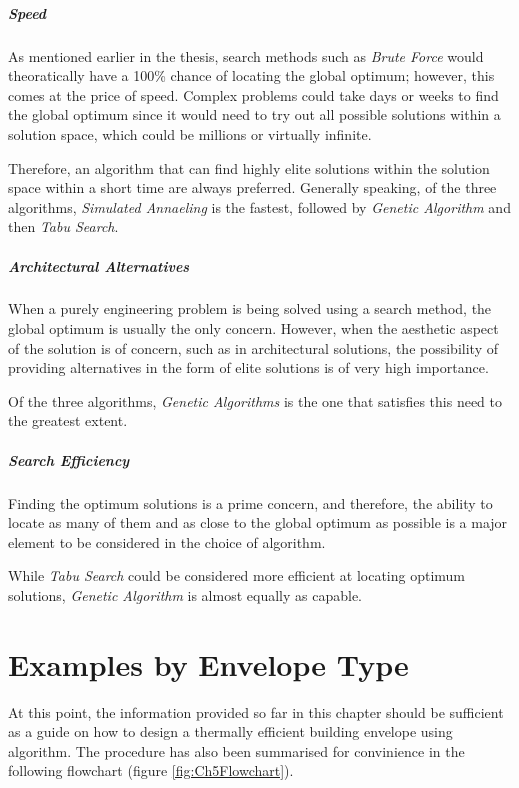\subparagraph{Speed}

As mentioned earlier in the thesis, search methods such as \emph{Brute Force} would theoratically have a 100\% chance of locating the global optimum; however, this comes at the price of speed. Complex problems could take days or weeks to find the global optimum since it would need to try out all possible solutions within a solution space, which could be millions or virtually infinite.

Therefore, an algorithm that can find highly elite solutions within the solution space within a short time are always preferred. Generally speaking, of the three algorithms, \emph{Simulated Annaeling} is the fastest, followed by \emph{Genetic Algorithm} and then \emph{Tabu Search}.

\subparagraph{Architectural Alternatives}

When a purely engineering problem is being solved using a search method, the global optimum is usually the only concern. However, when the aesthetic aspect of the solution is of concern, such as in architectural solutions, the possibility of providing alternatives in the form of elite solutions is of very high importance.

Of the three algorithms, \emph{Genetic Algorithms} is the one that satisfies this need to the greatest extent.

\subparagraph{Search Efficiency}

Finding the optimum solutions is a prime concern, and therefore, the ability to locate as many of them and as close to the global optimum as possible is a major element to be considered in the choice of algorithm.

While \emph{Tabu Search} could be considered more efficient at locating optimum solutions, \emph{Genetic Algorithm} is almost equally as capable.


\clearpage
\section{Examples by Envelope Type}

At this point, the information provided so far in this chapter should be sufficient as a guide on how to design a thermally efficient building envelope using algorithm. The procedure has also been summarised for convinience in the following flowchart (figure \ref{fig:Ch5Flowchart}).

